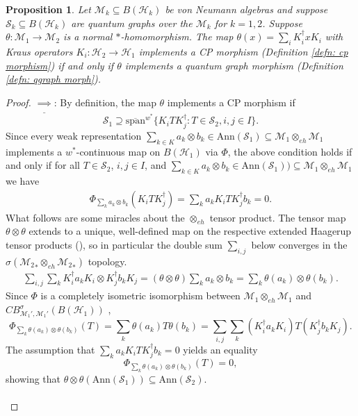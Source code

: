 \documentclass[12pt]{article}
\newtheorem{proposition}[theorem]{Proposition}
\theoremstyle{definition}
\newcommand{\Span}{\text{span}}
\newcommand{\mc}[1]{\mathcal{#1}}
\newcommand{\<}{\langle}
\renewcommand{\>}{\rangle}
\newcommand{\Ann}{\text{Ann}}
\newcommand{\eh}{\otimes_{eh}}
\begin{document}
\begin{proposition} \label{prop: cp-morph-qmorph}
    Let $\mc M_k \subseteq B(\mc H_k)$ be von Neumann algebras and suppose $\mc S_k \subseteq B(\mc H_k)$ are quantum graphs over the $\mc M_k$ for $k =1,2$. Suppose $\theta: \mc M_1 \to \mc M_2$ is a normal $*$-homomorphism. The map $\theta(x) = \sum_i K_i^\dagger x K_i$ with Kraus operators $K_i: \mc H_2 \to \mc H_1$ implements a CP morphism (Definition \ref{defn: cp morphism}) if and only if $\theta$ implements a quantum graph morphism (Definition \ref{defn: qgraph morph}). 
\end{proposition}
\begin{proof}
    $\underline{\implies}$: By definition, the map $\theta$ implements a CP morphism if 
    \[
    \mc S_1 \supseteq \overline{\Span}^{w^*}\{K_i T K_j^\dagger : T \in \mc S_2, i,j \in I\}.
    \]
    Since every weak representation $\sum_{k \in K} a_k \otimes b_k \in \Ann(\mc S_1) \subseteq \mc M_1 \eh \mc M_1$ implements a $w^*$-continuous map on $B(\mc H_1)$ via $\Phi$, the above condition holds if and only if for all $T \in \mc S_2$, $i,j \in I$, and $\sum_{k \in K} a_k \otimes b_k \in \Ann(\mc S_1)) \subseteq \mc M_1 \eh \mc M_1$ we have
    \begin{align} \label{eqn: 1}
    \Phi_{\sum_k a_k \otimes b_k} (K_i T K_j^\dagger) = \sum_k  a_k K_iTK_j^\dagger  b_k = 0.
    \end{align}
    What follows are some miracles about the $\eh$ tensor product. The tensor map
    $\theta \otimes \theta$ extends to a unique, well-defined map on the respective extended Haagerup tensor products (\cite[Proposition 3.7]{blecher-smith-w*h}), so in particular the double sum $\sum_{i,j}$ below converges in the $\sigma ({\mc M_2}_* \eh {\mc M_2}_*)$ topology. 
    \begin{align*}
    \sum_{i,j} \sum_k K_i^\dagger a_kK_i \otimes K_j^\dagger b_kK_j = (\theta \otimes \theta) \sum_k a_k \otimes b_k = \sum_k \theta(a_k) \otimes \theta(b_k).
    \end{align*}
    Since $\Phi$ is a completely isometric isomorphism between $\mc M_1 \eh \mc M_1$ and $CB^\sigma_{\mc M_1', \mc M_1'}(B(\mc H_1))$ \cite[Theorem 4.2]{blecher-smith-w*h}, 
    \[
    \Phi_{\sum_k \theta(a_k) \otimes \theta(b_k)}(T) =\sum_k \theta(a_k)T \theta(b_k)= \sum_{i,j} \sum_k (K_i^\dagger a_kK_i )T (K_j^\dagger b_kK_j) .
    \]
    The assumption that $\sum_k a_k K_iTK_j^\dagger b_k = 0$ yields an equality 
    \[
    \Phi_{\sum_k \theta(a_k) \otimes \theta(b_k)}(T) = 0,
    \]
    showing that $\theta \otimes \theta(\Ann(\mc S_1)) \subseteq \Ann(\mc S_2)$. \\\\

\end{proof}
\end{document}
